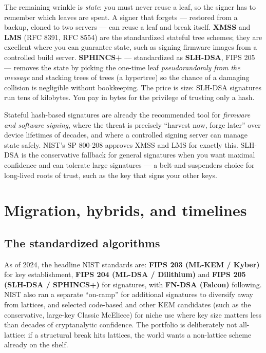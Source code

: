 The remaining wrinkle is \emph{state}: you must never reuse a leaf, so the signer has to remember which leaves are spent. A signer that forgets --- restored from a backup, cloned to two servers --- can reuse a leaf and break itself. \textbf{XMSS} and \textbf{LMS} (RFC 8391, RFC 8554) are the standardized stateful tree schemes; they are excellent where you can guarantee state, such as signing firmware images from a controlled build server. \textbf{SPHINCS+} --- standardized as \textbf{SLH-DSA}, FIPS 205 --- removes the state by picking the one-time leaf \emph{pseudorandomly from the message} and stacking trees of trees (a hypertree) so the chance of a damaging collision is negligible without bookkeeping. The price is size: SLH-DSA signatures run tens of kilobytes. You pay in bytes for the privilege of trusting only a hash.

\begin{applicationbox}
Stateful hash-based signatures are already the recommended tool for \emph{firmware and software signing}, where the threat is precisely ``harvest now, forge later'' over device lifetimes of decades, and where a controlled signing server can manage state safely. NIST's SP 800-208 approves XMSS and LMS for exactly this. SLH-DSA is the conservative fallback for general signatures when you want maximal confidence and can tolerate large signatures --- a belt-and-suspenders choice for long-lived roots of trust, such as the key that signs your other keys.
\end{applicationbox}

\section{Migration, hybrids, and timelines}
\label{ch35:migration}

\subsection{The standardized algorithms}
\label{ch35:nist}

As of 2024, the headline NIST standards are: \textbf{FIPS 203 (ML-KEM / Kyber)} for key establishment, \textbf{FIPS 204 (ML-DSA / Dilithium)} and \textbf{FIPS 205 (SLH-DSA / SPHINCS+)} for signatures, with \textbf{FN-DSA (Falcon)} following. NIST also ran a separate ``on-ramp'' for additional signatures to diversify away from lattices, and selected code-based and other KEM candidates (such as the conservative, large-key Classic McEliece) for niche use where key size matters less than decades of cryptanalytic confidence. The portfolio is deliberately not all-lattice: if a structural break hits lattices, the world wants a non-lattice scheme already on the shelf.

